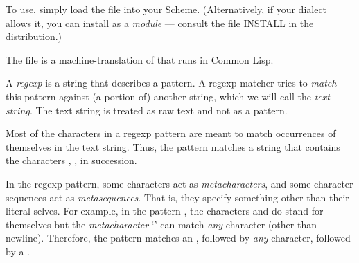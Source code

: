 \ifx\MzLibManual\Undefined
To use, simply load the file  into
your Scheme.  
(Alternatively, if your dialect allows it, you can
install  as a {\em module} --- consult
the file \url{INSTALL} in the distribution.)

The file  is a machine-translation
of  that runs in Common Lisp.
 
\htmlonly



\tableofcontents
\endhtmlonly
\fi


A {\em regexp} is a string that describes a pattern.  A
regexp matcher tries to {\em match} this pattern
against (a portion of) another string, which we
will call the {\em text string}.  The text string
is treated as raw text and not as a pattern.  

Most of the characters in a regexp pattern are meant to
match occurrences of themselves in the text string.
Thus, the pattern  matches a string that
contains the characters , ,  in succession.

In the regexp pattern, some characters  act as {\em
metacharacters}, and some character sequences act as
{\em metasequences}.  That is, they specify something
other than their literal selves.  For example, in the
pattern , the characters  and  do
stand for themselves but the {\em metacharacter} `'
can match {\em any} character (other than
newline).  Therefore, the pattern 
matches an , followed by {\em any} character,
followed by a . 

